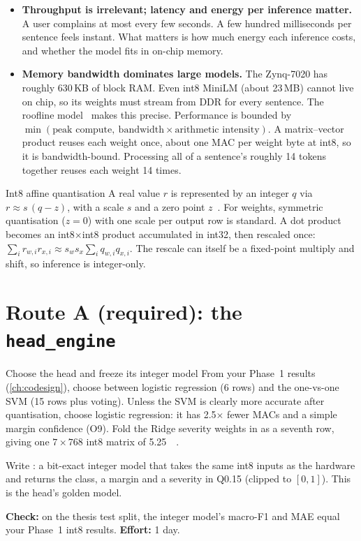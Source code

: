 \begin{itemize}
  \item \textbf{Throughput is irrelevant; latency and energy per inference
  matter.} A user complains at most every few seconds. A few hundred milliseconds
  per sentence feels instant. What matters is how much energy each inference
  costs, and whether the model fits in on-chip memory.
  \item \textbf{Memory bandwidth dominates large models.} The Zynq-7020 has
  roughly 630\,KB of block RAM. Even int8 MiniLM (about 23\,MB) cannot live on
  chip, so its weights must stream from DDR for every sentence. The roofline
  model~\cite{williams2009roofline} makes this precise. Performance is bounded
  by $\min(\text{peak compute},\ \text{bandwidth}\times\text{arithmetic
  intensity})$. A matrix--vector product reuses each weight once, about one MAC
  per weight byte at int8, so it is bandwidth-bound. Processing all of a
  sentence's roughly 14 tokens together reuses each weight 14 times.
\end{itemize}

\begin{conceptbox}{Int8 affine quantisation}
A real value $r$ is represented by an integer $q$ via $r \approx s\,(q-z)$, with
a scale $s$ and a zero point $z$~\cite{jacob2018quantization}. For weights,
symmetric quantisation ($z=0$) with one scale per output row is standard. A dot
product becomes an int8$\times$int8 product accumulated in int32, then rescaled
once: $\sum_i r_{w,i}r_{x,i}\approx s_w s_x\sum_i q_{w,i}q_{x,i}$. The rescale
can itself be a fixed-point multiply and shift, so inference is integer-only.
\end{conceptbox}

\section{Route A (required): the \texttt{head\_engine}}\label{sec:ml:head}

\begin{stepbox}[label=st:ml:headchoice]{Choose the head and freeze its integer model}
From your Phase~1 results (\cref{ch:codesign}), choose between logistic
regression (6 rows) and the one-vs-one SVM (15 rows plus voting). Unless the SVM
is clearly more accurate after quantisation, choose logistic regression: it has
2.5$\times$ fewer MACs and a simple margin confidence (O9). Fold the Ridge
severity weights in as a seventh row, giving one $7\times768$ int8 matrix of
\qty{5.25}{\kibi\byte}.

Write : a bit-exact integer model that takes the
same int8 inputs as the hardware and returns the class, a margin and a severity
in Q0.15 (clipped to $[0,1]$). This is the head's golden model.

\textbf{Check:} on the thesis test split, the integer model's macro-F1 and MAE
equal your Phase~1 int8 results. \textbf{Effort:} 1 day.
\end{stepbox}

